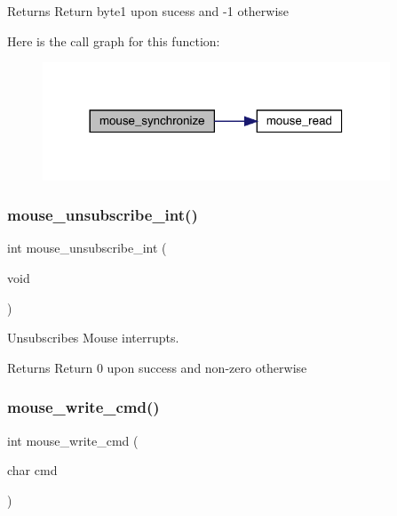 \begin{DoxyReturn}{Returns}
Return byte1 upon sucess and -\/1 otherwise 
\end{DoxyReturn}
Here is the call graph for this function\+:\nopagebreak
\begin{figure}[H]
\begin{center}
\leavevmode
\includegraphics[width=293pt]{group__mouse_gacf07c98dc574238b3da9388c3dd1042a_cgraph}
\end{center}
\end{figure}
\hypertarget{group__mouse_ga7614d1f22092d37078f6a3da58f7c957}{}\label{group__mouse_ga7614d1f22092d37078f6a3da58f7c957} 
\subsubsection{\texorpdfstring{mouse\+\_\+unsubscribe\+\_\+int()}{mouse\_unsubscribe\_int()}}
{\footnotesize\ttfamily int mouse\+\_\+unsubscribe\+\_\+int (\begin{DoxyParamCaption}\item[{void}]{ }\end{DoxyParamCaption})}



Unsubscribes Mouse interrupts. 

\begin{DoxyReturn}{Returns}
Return 0 upon success and non-\/zero otherwise 
\end{DoxyReturn}
\hypertarget{group__mouse_gad26aa3828c4a6d900e654de8e4e68e83}{}\label{group__mouse_gad26aa3828c4a6d900e654de8e4e68e83} 
\subsubsection{\texorpdfstring{mouse\+\_\+write\+\_\+cmd()}{mouse\_write\_cmd()}}
{\footnotesize\ttfamily int mouse\+\_\+write\+\_\+cmd (\begin{DoxyParamCaption}\item[{char}]{cmd }\end{DoxyParamCaption})}



